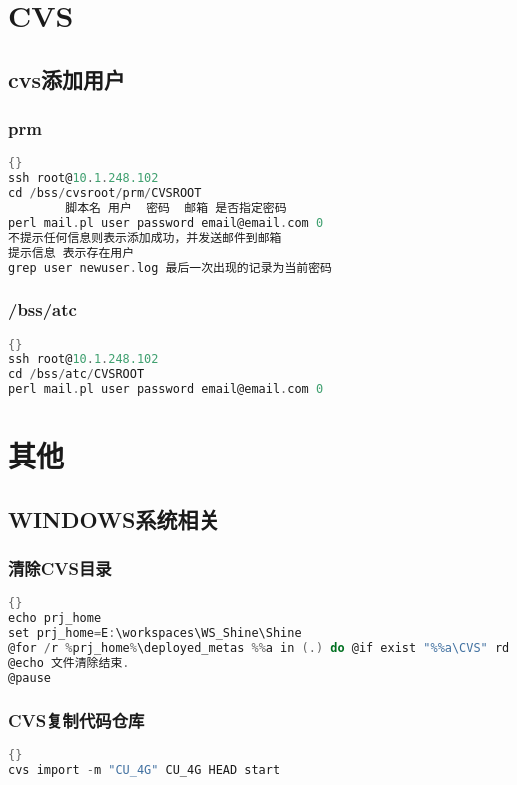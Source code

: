 \documentclass[11pt,a4paper]{article}
\begin{document}
	\section{CVS}
	\subsection{cvs添加用户}
		\subsubsection{prm}
		\begin{lstlisting}[language={C}]{}
ssh root@10.1.248.102
cd /bss/cvsroot/prm/CVSROOT
        脚本名 用户  密码  邮箱 是否指定密码
perl mail.pl user password email@email.com 0
不提示任何信息则表示添加成功，并发送邮件到邮箱
提示信息 表示存在用户
grep user newuser.log 最后一次出现的记录为当前密码
		\end{lstlisting}

		\subsubsection{/bss/atc}
		\begin{lstlisting}[language={C}]{}
ssh root@10.1.248.102
cd /bss/atc/CVSROOT
perl mail.pl user password email@email.com 0
		\end{lstlisting}

	\section{其他}
	\subsection{WINDOWS系统相关}
		\subsubsection{清除CVS目录}
		\begin{lstlisting}[language={C}]{}
echo prj_home
set prj_home=E:\workspaces\WS_Shine\Shine
@for /r %prj_home%\deployed_metas %%a in (.) do @if exist "%%a\CVS" rd /s /q "%%a\CVS"
@echo 文件清除结束.
@pause
		\end{lstlisting}
		
		\subsubsection{CVS复制代码仓库}
		\begin{lstlisting}[language={C}]{}
cvs import -m "CU_4G" CU_4G HEAD start
		\end{lstlisting}
\end{document}
